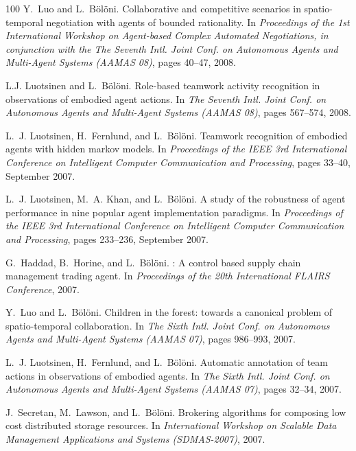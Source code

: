 \begin{thebibliography}{100}
Y.~Luo and L.~Bölöni.
\newblock Collaborative and competitive scenarios in spatio-temporal
  negotiation with agents of bounded rationality.
\newblock In {\em Proceedings of the 1st International Workshop on Agent-based
  Complex Automated Negotiations, in conjunction with the The Seventh Intl.
  Joint Conf. on Autonomous Agents and Multi-Agent Systems (AAMAS 08)}, pages
  40--47, 2008.

L.J. Luotsinen and L.~Bölöni.
\newblock Role-based teamwork activity recognition in observations of embodied
  agent actions.
\newblock In {\em The Seventh Intl. Joint Conf. on Autonomous Agents and
  Multi-Agent Systems (AAMAS 08)}, pages 567--574, 2008.

L.~J. Luotsinen, H.~Fernlund, and L.~Bölöni.
\newblock Teamwork recognition of embodied agents with hidden markov models.
\newblock In {\em Proceedings of the IEEE 3rd International Conference on
  Intelligent Computer Communication and Processing}, pages 33--40, September
  2007.

L.~J. Luotsinen, M.~A. Khan, and L.~Bölöni.
\newblock A study of the robustness of agent performance in nine popular agent
  implementation paradigms.
\newblock In {\em Proceedings of the IEEE 3rd International Conference on
  Intelligent Computer Communication and Processing}, pages 233--236, September
  2007.

G.~Haddad, B.~Horine, and L.~Bölöni.
: A control based supply chain management trading agent.
\newblock In {\em Proceedings of the 20th International FLAIRS Conference},
  2007.

Y.~Luo and L.~Bölöni.
\newblock Children in the forest: towards a canonical problem of
  spatio-temporal collaboration.
\newblock In {\em The Sixth Intl. Joint Conf. on Autonomous Agents and
  Multi-Agent Systems (AAMAS 07)}, pages 986--993, 2007.

L.~J. Luotsinen, H.~Fernlund, and L.~Bölöni.
\newblock Automatic annotation of team actions in observations of embodied
  agents.
\newblock In {\em The Sixth Intl. Joint Conf. on Autonomous Agents and
  Multi-Agent Systems (AAMAS 07)}, pages 32--34, 2007.

J.~Secretan, M.~Lawson, and L.~Bölöni.
\newblock Brokering algorithms for composing low cost distributed storage
  resources.
\newblock In {\em International Workshop on Scalable Data Management
  Applications and Systems (SDMAS-2007)}, 2007.


\end{thebibliography}
